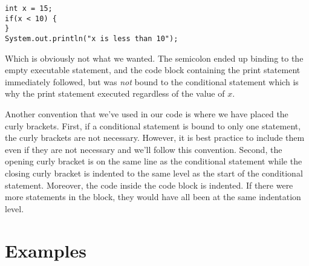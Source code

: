\begin{verbatim}
int x = 15;
if(x < 10) {
}
System.out.println("x is less than 10");
\end{verbatim}

Which is obviously not what we wanted.  The semicolon ended up binding 
to the empty executable statement, and the code block containing the
print statement immediately followed, but was \emph{not} bound to the
conditional statement which is why the print statement executed regardless
of the value of $x$.

Another convention that we've used in our code is where we have placed the
curly brackets.  First, if a conditional statement is bound to only one statement, 
the curly brackets are not necessary.  However, it is best practice to include them
even if they are not necessary and we'll follow this convention.  Second, the
opening curly bracket is on the same line as the conditional statement while
the closing curly bracket is indented to the same level as the start of the
conditional statement.  Moreover, the code inside the code block is indented.
If there were more statements in the block, they would have all been at the
same indentation level.

%
%
%
%

\section{Examples}

